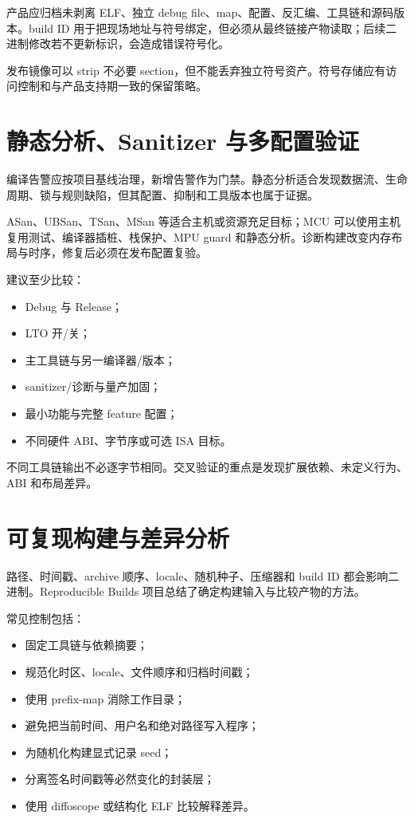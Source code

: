 产品应归档未剥离 ELF、独立 debug file、map、配置、反汇编、工具链和源码版本。build ID 用于把现场地址与符号绑定，但必须从最终链接产物读取；后续二进制修改若不更新标识，会造成错误符号化。

发布镜像可以 strip 不必要 section，但不能丢弃独立符号资产。符号存储应有访问控制和与产品支持期一致的保留策略。

\section{静态分析、Sanitizer 与多配置验证}

编译告警应按项目基线治理，新增告警作为门禁。静态分析适合发现数据流、生命周期、锁与规则缺陷，但其配置、抑制和工具版本也属于证据。

ASan、UBSan、TSan、MSan 等适合主机或资源充足目标；MCU 可以使用主机复用测试、编译器插桩、栈保护、MPU guard 和静态分析。诊断构建改变内存布局与时序，修复后必须在发布配置复验。

建议至少比较：

\begin{itemize}
  \item Debug 与 Release；
  \item LTO 开/关；
  \item 主工具链与另一编译器/版本；
  \item sanitizer/诊断与量产加固；
  \item 最小功能与完整 feature 配置；
  \item 不同硬件 ABI、字节序或可选 ISA 目标。
\end{itemize}

不同工具链输出不必逐字节相同。交叉验证的重点是发现扩展依赖、未定义行为、ABI 和布局差异。

\section{可复现构建与差异分析}

路径、时间戳、archive 顺序、locale、随机种子、压缩器和 build ID 都会影响二进制。Reproducible Builds 项目总结了确定构建输入与比较产物的方法\cite{reproducible-builds}。

常见控制包括：

\begin{itemize}
  \item 固定工具链与依赖摘要；
  \item 规范化时区、locale、文件顺序和归档时间戳；
  \item 使用 prefix-map 消除工作目录；
  \item 避免把当前时间、用户名和绝对路径写入程序；
  \item 为随机化构建显式记录 seed；
  \item 分离签名时间戳等必然变化的封装层；
  \item 使用 diffoscope 或结构化 ELF 比较解释差异。
\end{itemize}


